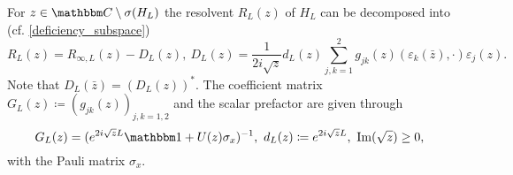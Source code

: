 \begin{lemma}\label{fr01t}
For $z\in\C\setminus\sigma(H_L)$ the resolvent $R_L(z)$ of $H_L$ can be decomposed into (cf. \eqref{deficiency_subspace})
\begin{equation}\label{fr01t01}
  R_L(z) = R_{\infty,L}(z) - D_L(z),\ 
  D_L(z) = \frac{1}{2i\sqrt{z}}d_L(z)\sum_{j,k=1}^2 g_{jk}(z) ( \varepsilon_k(\bar z), \cdot )\varepsilon_j(z) .
\end{equation}
Note that $D_L(\bar{z})=(D_L(z))^*$.
The coefficient matrix $G_L(z)\coloneqq (g_{jk}(z))_{j,k=1,2}$ and the scalar prefactor are given through
\begin{equation}\label{fr01t02}
  G_L(z) = ( e^{2i\sqrt{z}L}\id + U(z)\sigma_x )^{-1},\
  d_L(z) \coloneqq e^{2i\sqrt{z}L} ,\
  \im(\sqrt{z})\geq 0,
\end{equation}
with the Pauli matrix $\sigma_x$.
\end{lemma}
